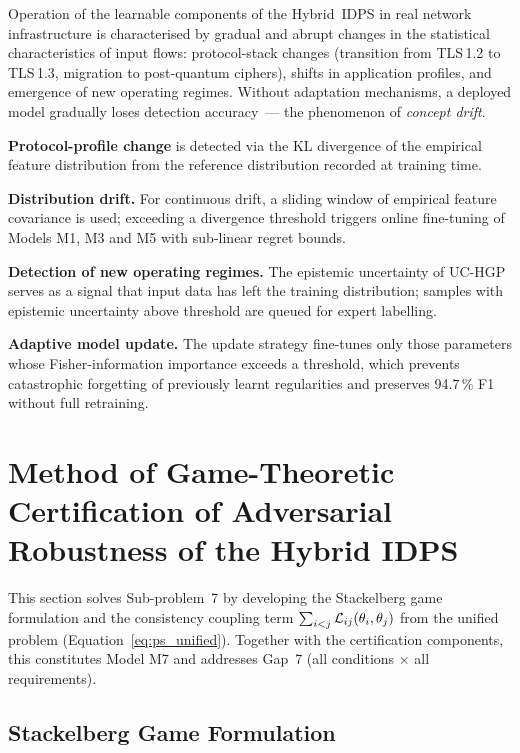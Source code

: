Operation of the learnable components of the Hybrid~IDPS in real network
infrastructure is characterised by gradual and abrupt changes in the
statistical characteristics of input flows: protocol-stack changes
(transition from TLS\,1.2 to TLS\,1.3, migration to post-quantum ciphers),
shifts in application profiles, and emergence of new operating regimes.
Without adaptation mechanisms, a deployed model gradually loses detection
accuracy~--- the phenomenon of \emph{concept drift}.

\textbf{Protocol-profile change} is detected via the KL divergence of the
empirical feature distribution from the reference distribution recorded
at training time.

\textbf{Distribution drift.} For continuous drift, a sliding window of
empirical feature covariance is used; exceeding a divergence threshold
triggers online fine-tuning of Models M1, M3 and M5 with sub-linear
regret bounds.

\textbf{Detection of new operating regimes.} The epistemic uncertainty of
UC-HGP serves as a signal that input data has left the training
distribution; samples with epistemic uncertainty above threshold are
queued for expert labelling.

\textbf{Adaptive model update.} The update strategy fine-tunes only those
parameters whose Fisher-information importance exceeds a threshold, which
prevents catastrophic forgetting of previously learnt regularities and
preserves 94.7\,\% F1 without full retraining.
\section{Method of Game-Theoretic Certification of Adversarial Robustness of the Hybrid IDPS}
\label{sec:game}

This section solves Sub-problem~7 by developing the Stackelberg game formulation and the consistency coupling term $\sum_{i<j}\mathcal{L}_{ij}(\theta_i,\theta_j)$ from the unified problem (Equation~\eqref{eq:ps_unified}). Together with the certification components, this constitutes Model M7 and addresses Gap~7 (all conditions $\times$ all requirements).

\subsection{Stackelberg Game Formulation}

